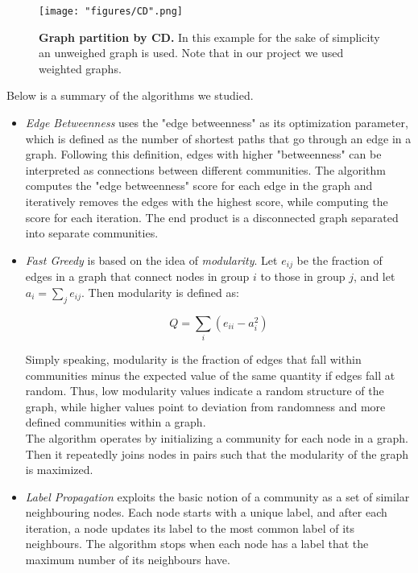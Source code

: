 \begin{figure}[h]
  \centering
  \texttt{[image: "figures/CD".png]}
  \caption{\textbf{Graph partition by \acrlong{CD}.} In this example for the sake of simplicity an unweighed graph is used. Note that in our project we used weighted graphs.}
  \label{fig:CD}
\end{figure}

Below is a summary of the algorithms we studied.
\begin{itemize}

\item \textit{Edge Betweenness}\cite{girvannewman2002} uses the "edge betweenness" as its optimization parameter, which is defined as the number of shortest paths that go through an edge in a graph. Following this definition, edges with higher "betweenness" can be interpreted as connections between different communities. The algorithm computes the "edge betweenness" score for each edge in the graph and iteratively removes the edges with the highest score, while computing the score for each iteration. The end product is a disconnected graph separated into separate communities.

\item \textit{Fast Greedy}\cite{Newman_2004} is based on the idea of \textit{modularity}. Let $e_{ij}$ be the fraction of edges in a graph that connect nodes in group $i$ to those in group $j$, and let 
$a_i = \sum_j e_{ij}$. Then modularity is defined as:

\begin{equation}
\label{eqn:modularity}
Q = \sum_i (e_{ii}-a_i^2)
\end{equation}

Simply speaking, modularity is the fraction of edges that fall within communities minus the expected value of the same quantity if edges fall at random. Thus, low modularity values indicate a random structure of the graph, while higher values point to deviation from randomness and more defined communities within a graph.\\
The algorithm operates by initializing a community for each node in a graph. Then it repeatedly joins nodes in pairs such that the modularity of the graph is maximized.

\item \textit{Label Propagation}\cite{Raghavan_2007} exploits the basic notion of a community as a set of similar neighbouring nodes. Each node starts with a unique label, and after each iteration, a node updates its label to the most common label of its neighbours. The algorithm stops when each node has a label that the maximum number of its neighbours have.


\end{itemize}

